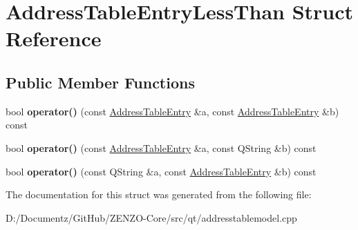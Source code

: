 \hypertarget{struct_address_table_entry_less_than}{}\section{Address\+Table\+Entry\+Less\+Than Struct Reference}
\label{struct_address_table_entry_less_than}
\subsection*{Public Member Functions}
\begin{DoxyCompactItemize}
\item 
\mbox{\label{struct_address_table_entry_less_than_a0fdbbdb81908a5353470b0ad33497df8}} 
bool {\bfseries operator()} (const \mbox{\hyperlink{struct_address_table_entry}{Address\+Table\+Entry}} \&a, const \mbox{\hyperlink{struct_address_table_entry}{Address\+Table\+Entry}} \&b) const
\item 
\mbox{\label{struct_address_table_entry_less_than_ac29af39cd6bf6448464d2c2259c65a48}} 
bool {\bfseries operator()} (const \mbox{\hyperlink{struct_address_table_entry}{Address\+Table\+Entry}} \&a, const Q\+String \&b) const
\item 
\mbox{\label{struct_address_table_entry_less_than_a9762e0ef749fcdcfeda3f741eb4f71b8}} 
bool {\bfseries operator()} (const Q\+String \&a, const \mbox{\hyperlink{struct_address_table_entry}{Address\+Table\+Entry}} \&b) const
\end{DoxyCompactItemize}


The documentation for this struct was generated from the following file\+:\begin{DoxyCompactItemize}
\item 
D\+:/\+Documentz/\+Git\+Hub/\+Z\+E\+N\+Z\+O-\/\+Core/src/qt/addresstablemodel.\+cpp\end{DoxyCompactItemize}
